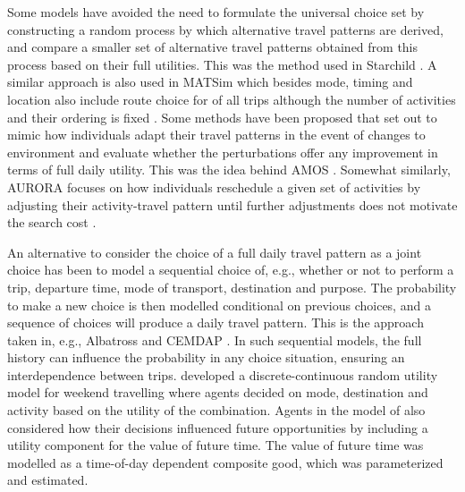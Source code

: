 Some models have avoided the need to formulate the universal choice set by constructing a random process by which alternative travel patterns are derived, and compare a smaller set of alternative travel patterns obtained from this process based on their full utilities.  
This was the method used in Starchild \citep{recker86starchild1,recker86starchild2}. A similar approach is also used in MATSim which besides mode, timing and location also include route choice for of all trips although the number of activities and their ordering is fixed  \citep{lefebvre2007fast,grether2009mode,balmer05,horni2011}. Some methods have been proposed that set out to mimic how individuals adapt their travel patterns in the event of changes to environment and evaluate whether the perturbations offer any improvement in terms of full daily utility. This was the idea behind AMOS \citep{kitamura1996Sams}. Somewhat similarly, AURORA focuses on how individuals reschedule a given set of activities by adjusting their activity-travel pattern until further adjustments does not motivate the search cost \citep{timmermans2001modeling,joh2003Aurora, johEstimationAurora2005}.

An alternative to consider the choice of a full daily travel pattern as a joint choice has been to model a sequential choice of, e.g., whether or not to perform a trip, departure time, mode of transport, destination and purpose. The probability to make a new choice is then modelled conditional on previous choices, and a sequence of choices will produce a daily travel pattern. This is the approach taken in, e.g., Albatross \citep{timmermans2001modeling} and CEMDAP \citep{bhat04}. In such sequential models, the full history can influence the probability in any choice situation, ensuring an interdependence between trips. \citet{Habib11RUM} developed a discrete-continuous random utility model for weekend travelling where agents decided on mode, destination and activity based on the utility of the combination. Agents in the model of \citet{Habib11RUM} also considered how their decisions influenced future opportunities by including a utility component for the value of future time. The value of future time was modelled as a time-of-day dependent composite good, which was parameterized and estimated. 

